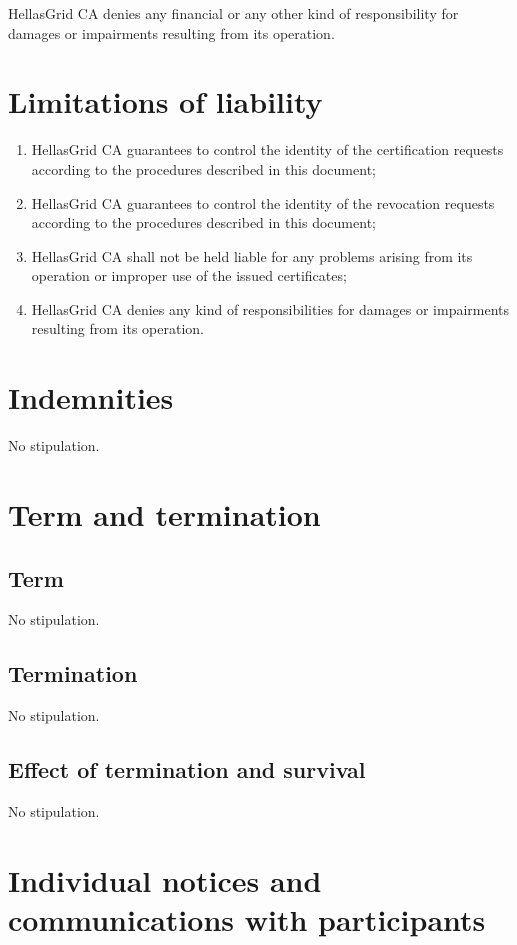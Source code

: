 HellasGrid CA denies any financial or any other kind of responsibility for damages or impairments resulting from its operation.

\section{Limitations of liability}

\begin{enumerate}
\item{HellasGrid CA guarantees to control the identity of the certification requests according to the procedures described in this document;}
\item{HellasGrid CA guarantees to control the identity of the revocation requests according to the procedures described in this document;}
\item{HellasGrid CA shall not be held liable for any problems arising from its operation or improper use of the issued certificates;}
\item{HellasGrid CA denies any kind of responsibilities for damages or impairments resulting from its operation.}
\end{enumerate}

\section{Indemnities}

No stipulation. 

\section{Term and termination}
\subsection{Term}

No stipulation.

\subsection{Termination}

No stipulation.


\subsection{Effect of termination and survival}

No stipulation.

\section{Individual notices and communications with participants}

